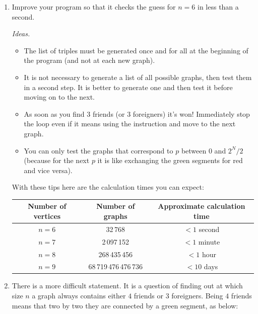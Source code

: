 \documentclass[11pt,class=report,crop=false]{standalone}
\begin{document}
\begin{activite}[To go further]


\begin{enumerate}
  \item Improve your program so that it checks the guess for $n=6$ in less than a second.
  
  
\emph{Ideas.}
  \begin{itemize}
    \item The list of triples must be generated once and for all at the beginning of the program (and not at each new graph).
    \item It is not necessary to generate a list of all possible graphs, then test them in a second step. It is better to generate one and then test it before moving on to the next.
    \item As soon as you find $3$ friends (or $3$ foreigners) it's won! Immediately stop the loop even if it means using the instruction  and move to the next graph.
    \item You can only test the graphs that correspond to $p$ between $0$ and $2^{N}/2$ (because for the next $p$ it is like exchanging the green segments for red and vice versa).
  \end{itemize}
  
\medskip
  
  With these tips here are the calculation times you can expect:
  \begin{center}
  \begin{tabular}{|c|c|c|}
  \hline
  Number of vertices & Number of graphs & Approximate calculation time \\
  \hline\hline
  $n=6$ & 32\,768 & $< 1$ second \\
  $n=7$ & 2\,097\,152 & $< 1$ minute \\  
  $n=8$ & 268\,435\,456 & $< 1$ hour \\
  $n=9$ & 68\,719\,476\,476\,736 & $< 10$ days \\ 
  \hline
  \end{tabular} 
  \end{center}




 
  \item There is a more difficult statement. It is a question of finding out at which size $n$ a graph always contains either $4$ friends or $3$ foreigners. 
  Being $4$ friends means that two by two they are connected by a green segment, as below:


\end{enumerate}
\end{activite}
\end{document}

